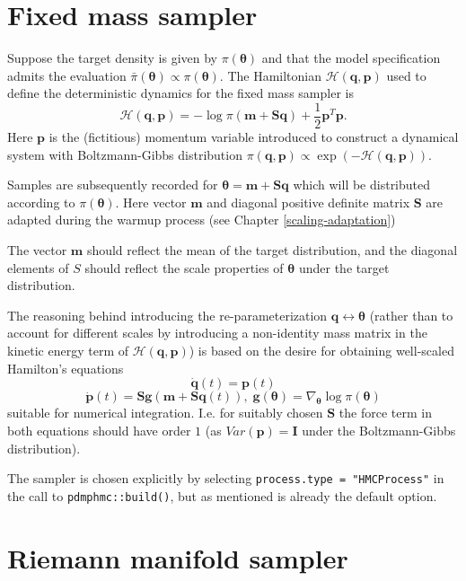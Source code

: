 \documentclass[
]{book}
\begin{document}
\hypertarget{fixed-mass-sampler}{%
\section{Fixed mass sampler}\label{fixed-mass-sampler}}

Suppose the target density is given by \(\pi (\boldsymbol \theta)\) and that the model specification admits the evaluation \(\bar \pi(\boldsymbol \theta) \propto \pi (\boldsymbol \theta)\). The Hamiltonian \(\mathcal H(\mathbf q,\mathbf p)\) used to define the deterministic dynamics for the fixed mass sampler is
\[
\mathcal H(\mathbf q,\mathbf p) = -\log \pi(\mathbf m + \mathbf S \mathbf q) + \frac{1}{2} \mathbf p^T \mathbf p.
\]
Here \(\mathbf p\) is the (fictitious) momentum variable introduced to construct a dynamical system with Boltzmann-Gibbs distribution \(\pi(\mathbf q, \mathbf p) \propto \exp(-\mathcal H(\mathbf q,\mathbf p))\).

Samples are subsequently recorded for \(\boldsymbol \theta=\mathbf m + \mathbf S \mathbf q\) which will be distributed according to \(\pi(\boldsymbol \theta)\). Here vector \(\mathbf m\) and diagonal positive definite matrix \(\mathbf S\) are adapted during the warmup process (see Chapter \ref{scaling-adaptation})

The vector \(\mathbf m\) should reflect the mean of the target distribution, and the diagonal elements of \(S\) should reflect the scale properties of \(\boldsymbol \theta\) under the target distribution.

The reasoning behind introducing the re-parameterization \(\mathbf q \leftrightarrow \boldsymbol \theta\) (rather than to account for different scales by introducing a non-identity mass matrix in the kinetic energy term of \(\mathcal H(\mathbf q,\mathbf p)\))
is based on the desire for obtaining well-scaled Hamilton's equations
\[
\dot{ \mathbf q}(t) = \mathbf p(t)
\]
\[
\dot{\mathbf p}(t) = \mathbf S \mathbf g(\mathbf m+\mathbf S \mathbf q(t)), \; \mathbf g(\boldsymbol \theta) = \nabla_{\boldsymbol \theta}\log \pi (\boldsymbol \theta)
\]
suitable for numerical integration. I.e. for suitably chosen \(\mathbf S\) the force term in both equations should have order \(1\) (as \(Var(\mathbf p)=\mathbf I\) under the Boltzmann-Gibbs distribution).

The sampler is chosen explicitly by selecting \texttt{process.type\ =\ "HMCProcess"} in the call to \texttt{pdmphmc::build()}, but as mentioned is already the default option.

\hypertarget{Riemann-manifold}{%
\section{Riemann manifold sampler}\label{Riemann-manifold}}
\end{document}
